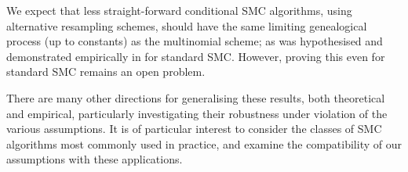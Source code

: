 \documentclass{article}
\begin{document}
We expect that less straight-forward conditional SMC algorithms, using alternative resampling schemes, should have the same limiting genealogical process (up to constants) as the multinomial scheme; as was hypothesised and demonstrated empirically in \citet{koskela2018} for standard SMC. However, proving this even for standard SMC remains an open problem.

There are many other directions for generalising these results, both theoretical and empirical, particularly investigating their robustness under violation of the various assumptions. It is of particular interest to consider the classes of SMC algorithms most commonly used in practice, and examine the compatibility of our assumptions with these applications.


\end{document}
